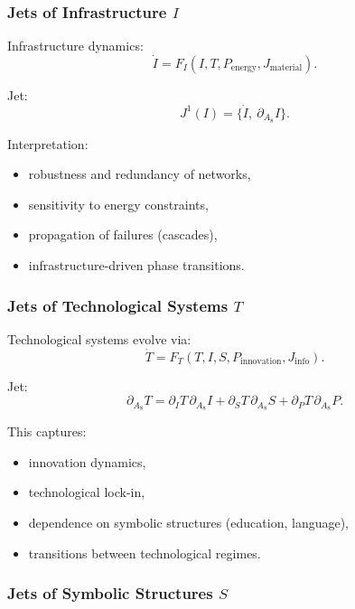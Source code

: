 \subsubsection{Jets of Infrastructure \texorpdfstring{$I$}{I}}

Infrastructure dynamics:
\[
\dot{I} = F_I(I, T, P_{\mathrm{energy}}, J_{\mathrm{material}}).
\]

Jet:
\[
J^1(I)=\{\dot{I},\ \partial_{A_8}I\}.
\]

Interpretation:
\begin{itemize}
    \item robustness and redundancy of networks,
    \item sensitivity to energy constraints,
    \item propagation of failures (cascades),
    \item infrastructure-driven phase transitions.
\end{itemize}


\subsubsection{Jets of Technological Systems \texorpdfstring{$T$}{T}}

Technological systems evolve via:
\[
\dot{T} = F_T(T, I, S, P_{\mathrm{innovation}}, J_{\mathrm{info}}).
\]

Jet:
\[
\partial_{A_8}T=
\partial_I T\,\partial_{A_8}I
+
\partial_S T\,\partial_{A_8}S
+
\partial_P T\,\partial_{A_8}P.
\]

This captures:
\begin{itemize}
    \item innovation dynamics,
    \item technological lock-in,
    \item dependence on symbolic structures (education, language),
    \item transitions between technological regimes.
\end{itemize}


\subsubsection{Jets of Symbolic Structures \texorpdfstring{$S$}{S}}

